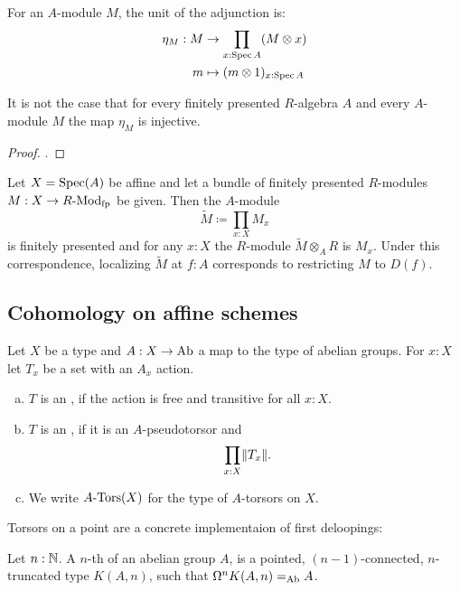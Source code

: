 For an $A$-module $M$,
the unit of the adjunction is:
\begin{align*}
  \eta_M : M &\to \prod_{x : \operatorname{Spec} A} (M \otimes x) \\
  m &\mapsto (m \otimes 1)_{x : \operatorname{Spec} A}
\end{align*}

\begin{example}
  It is not the case that
  for every finitely presented $R$-algebra $A$
  and every $A$-module $M$
  the map $\eta_M$ is injective.
\end{example}

\begin{proof}
  \cite{topology-draft}.
\end{proof}

\begin{theorem}%
  \label{fp-module}
  Let $X=\operatorname{Spec}(A)$ be affine and
  let a bundle of finitely presented $R$-modules $M : X\to R\text{-}\mathrm{Mod}_{\text{fp}}$ be given.
  Then the $A$-module
  \[ \tilde{M}\coloneqq\prod_{x:X}M_x \]
  is finitely presented and for any $x:X$ the $R$-module $\tilde{M}\otimes_A R$ is $M_x$.
  Under this correspondence, localizing $\tilde{M}$ at $f:A$ corresponds to restricting $M$ to $D(f)$.
\end{theorem}

\subsection{Cohomology on affine schemes}

\begin{definition}%
  \label{torsor}
  Let $X$ be a type and $A:X\to \operatorname{Ab}$ a map to the type of abelian groups.
  For $x:X$ let $T_x$ be a set with an $A_x$ action.
  \begin{enumerate}[(a)]
  \item $T$ is an , if the action is free and transitive for all $x:X$.
  \item $T$ is an , if it is an $A$-pseudotorsor and
    \[ \prod_{x:X} \propTrunc{ T_x } \rlap{.}\]
  \item We write $A\text{-}\mathrm{Tors}(X)$ for the type of $A$-torsors on $X$.
  \end{enumerate}
\end{definition}

Torsors on a point are a concrete implementaion of first deloopings:

\begin{definition}
  \label{delooping}
  Let $n:\mathbb{N}$.
  A $n$-th  of an abelian group $A$,
  is a pointed, $(n-1)$-connected, $n$-truncated type $K(A,n)$,
  such that $\Omega^nK(A,n)=_{\operatorname{Ab}}A$.
\end{definition}

